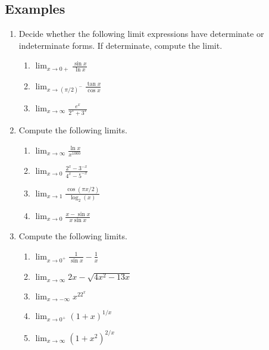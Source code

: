 \documentclass[11pt]{article}
\theoremstyle{definition}
\theoremstyle{named}
\numberwithin{myalgctr}{section}
\begin{document}
\subsection*{Examples}
\begin{enumerate}
  \item Decide whether the following limit expressions have determinate or indeterminate forms. If determinate, compute the limit.
  \begin{enumerate}
    \item $\displaystyle\lim_{x\to 0+}\frac{\sin x}{\ln x}$
    \item $\displaystyle\lim_{x\to (\pi/2)^-}\frac{\tan x}{\cos x}$
    \item $\displaystyle\lim_{x\to\infty}\frac{e^x}{2^x+3^x}$
  \end{enumerate}
  \item Compute the following limits.
  \begin{enumerate}
    \item $\displaystyle\lim_{x\to\infty}\frac{\ln x}{x^{1000}}$
    \item $\displaystyle\lim_{x\to 0}\frac{2^x-3^{-x}}{4^x-5^{-x}}$
    \item $\displaystyle\lim_{x\to 1}\frac{\cos(\pi x/2)}{\log_2(x)}$
    \item $\displaystyle\lim_{x\to 0}\frac{x-\sin x}{x\sin x}$
  \end{enumerate}
  \item Compute the following limits.
  \begin{enumerate}
    \item $\displaystyle\lim_{x\to 0^+}\frac{1}{\sin x}-\frac{1}{x}$
    \item $\displaystyle\lim_{x\to \infty}2x-\sqrt{4x^2-13x}$
    \item $\displaystyle\lim_{x\to -\infty}x^22^{x}$
    \item $\displaystyle\lim_{x\to 0^+}(1+x)^{1/x}$
    \item $\displaystyle\lim_{x\to \infty}(1+x^2)^{2/x}$
  \end{enumerate}
\end{enumerate}
\end{document}
